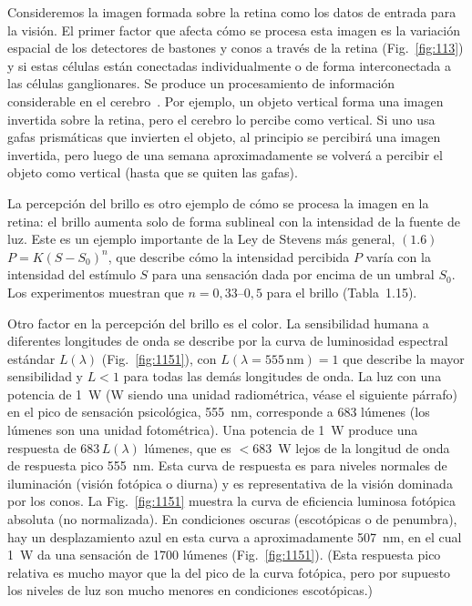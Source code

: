 \documentclass[12pt]{book}
\begin{document}
Consideremos la imagen formada sobre la retina como los datos de entrada para la visión. El primer factor que afecta cómo se procesa esta imagen es la variación espacial de los detectores de bastones y conos a través de la retina (Fig.~\ref{fig:113}) y si estas células están conectadas individualmente o de forma interconectada a las células ganglionares. Se produce un procesamiento de información considerable en el cerebro~\cite{22, 23, 24, 63, 65}. Por ejemplo, un objeto vertical forma una imagen invertida sobre la retina, pero el cerebro lo percibe como vertical. Si uno usa gafas prismáticas que invierten el objeto, al principio se percibirá una imagen invertida, pero luego de una semana aproximadamente se volverá a percibir el objeto como vertical (hasta que se quiten las gafas).

La percepción del brillo es otro ejemplo de cómo se procesa la imagen en la retina: el brillo aumenta solo de forma sublineal con la intensidad de la fuente de luz. Este es un ejemplo importante de la Ley de Stevens más general, $(1.6)$ $P = K(S-S_0)^n$, que describe cómo la intensidad percibida $P$ varía con la intensidad del estímulo $S$ para una sensación dada por encima de un umbral $S_0$. Los experimentos muestran que $n = 0{,}33\text{--}0{,}5$ para el brillo (Tabla~1.15).

Otro factor en la percepción del brillo es el color. La sensibilidad humana a diferentes longitudes de onda se describe por la curva de luminosidad espectral estándar $L(\lambda)$ (Fig.~\ref{fig:1151}), con $L(\lambda = 555\,\text{nm}) = 1$ que describe la mayor sensibilidad y $L < 1$ para todas las demás longitudes de onda. La luz con una potencia de 1~W (W siendo una unidad radiométrica, véase el siguiente párrafo) en el pico de sensación psicológica, 555~nm, corresponde a 683 lúmenes (los lúmenes son una unidad fotométrica). Una potencia de 1~W produce una respuesta de $683\,L(\lambda)$ lúmenes, que es $<683$~W lejos de la longitud de onda de respuesta pico 555~nm. Esta curva de respuesta es para niveles normales de iluminación (visión fotópica o diurna) y es representativa de la visión dominada por los conos. La Fig.~\ref{fig:1151} muestra la curva de eficiencia luminosa fotópica absoluta (no normalizada). En condiciones oscuras (escotópicas o de penumbra), hay un desplazamiento azul en esta curva a aproximadamente 507~nm, en el cual 1~W da una sensación de 1700 lúmenes (Fig.~\ref{fig:1151}). (Esta respuesta pico relativa es mucho mayor que la del pico de la curva fotópica, pero por supuesto los niveles de luz son mucho menores en condiciones escotópicas.)
\end{document}

